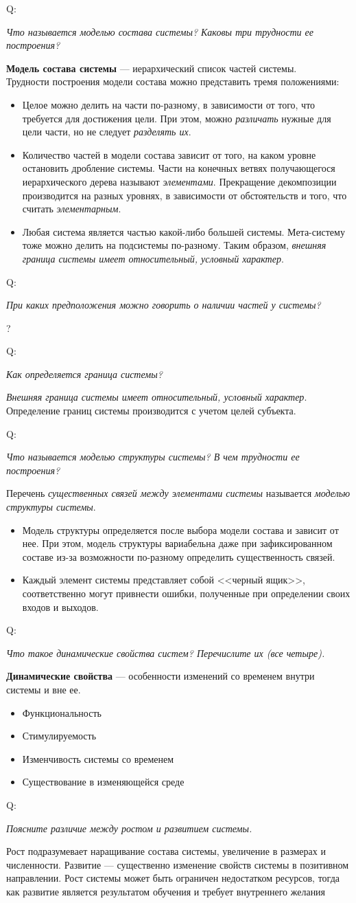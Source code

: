 \documentclass{article}
\newcommand{\note}[1]{\textit{#1}}
\newcommand{\define}[2]{
	\textbf{#1} --- #2
	}
\newcommand{\question}[2]{
	\begin{flushright}
		Q:\hspace{2ex}\vline\hspace{2ex}
		\begin{minipage}{0.9\textwidth}
			\large
			\textit{#1}
		\end{minipage}
	\end{flushright}
	\begin{center}
		\begin{minipage}{0.95\textwidth}
			#2
		\end{minipage}
	\end{center}
	}
\begin{document}
\question{Что называется моделью состава системы? Каковы три трудности ее построения?}{\define{Модель состава системы}{иерархический список частей системы.}\\Трудности построения модели состава можно представить тремя положениями:
	\begin{itemize}
		\item Целое можно делить на части по-разному, в зависимости от того, что требуется для достижения цели. При этом, можно \note{различать} нужные для цели части, но не следует \note{разделять их}.
		\item Количество частей в модели состава зависит от того, на каком уровне остановить дробление системы. Части на конечных ветвях получающегося иерархического дерева называют \note{элементами}. Прекращение декомпозиции производится на разных уровнях, в зависимости от обстоятельств и того, что считать \note{элементарным}.
		\item Любая система является частью какой-либо большей системы. Мета-систему тоже можно делить на подсистемы по-разному. Таким образом, \note{внешняя граница системы имеет относительный, условный характер}.
	\end{itemize}}
\question{При каких предположения можно говорить о наличии частей у системы?}{?}
\question{Как определяется граница системы?}{\note{Внешняя граница системы имеет относительный, условный характер}. Определение границ системы производится с учетом целей субъекта.}
\question{Что называется моделью структуры системы? В чем трудности ее построения?}{Перечень \note{существенных связей между элементами системы} называется \note{моделью структуры системы}.
	\begin{itemize}
		\item Модель структуры определяется после выбора модели состава и зависит от нее. При этом, модель структуры вариабельна даже при зафиксированном составе из-за возможности по-разному определить существенность связей.
		\item Каждый элемент системы представляет собой <<черный ящик>>, соответственно могут привнести ошибки, полученные при определении своих входов и выходов.
	\end{itemize}}	
\question{Что такое динамические свойства систем? Перечислите их (все четыре).}{\define{Динамические свойства}{особенности изменений со временем внутри системы и вне ее.}
	\begin{itemize}
		\item Функциональность
		\item Стимулируемость
		\item Изменчивость системы со временем
		\item Существование в изменяющейся среде
	\end{itemize}}
\question{Поясните различие между ростом и развитием системы.}{Рост подразумевает наращивание состава системы, увеличение в размерах и численности. Развитие --- существенно изменение свойств системы в позитивном направлении. Рост системы может быть ограничен недостатком ресурсов, тогда как развитие является результатом обучения и требует внутреннего желания}
\end{document}
